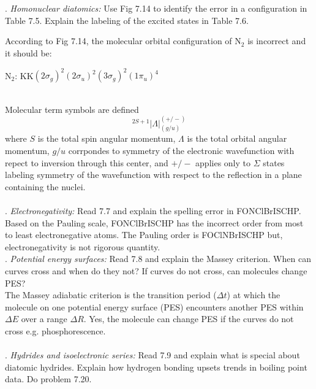 \documentclass{article}
\begin{document}
  \\
  \\
  . \textit{Homonuclear diatomics:} Use Fig 7.14 to identify the error in a configuration
  in Table 7.5. Explain the labeling of the excited states in Table 7.6.
  \\

  {\color{blue}
  According to Fig 7.14, the molecular orbital configuration of N$_2$ is incorrect and it
  should be:

  N$_2$: KK$(2\sigma_g)^2(2\sigma_u)^2(3\sigma_g)^2(1\pi_u)^4$}
  \\

  {\color{blue}
  Molecular term symbols are defined
  \begin{equation*}
    ^{2S+1}|\Lambda|_{(g/u)}^{(+/-)}
  \end{equation*}
  \noindent where $S$ is the total spin angular momentum, $\Lambda$ is the total orbital
  angular momentum, $g/u$ corrpondes to symmetry of the electronic wavefunction with repect
  to inversion through this center, and $+/-$ applies only to $\Sigma$ states labeling
  symmetry of the wavefunction with respect to the reflection in a plane containing the
  nuclei.}
  \\
  \\
  . \textit{Electronegativity:} Read 7.7 and explain the spelling error in FONClBrISCHP.
  \\

  {\color{blue}
  Based on the Pauling scale, FONClBrISCHP has the incorrect order from most to least electronegative
  atoms. The Pauling order is FOClNBrISCHP but, electronegativity is not rigorous quantity.}
  \\
  
  . \textit{Potential energy surfaces:} Read 7.8 and explain the Massey criterion.
  When can curves cross and when do they not? If curves do not cross, can molecules change
  PES?
  \\
  
  {\color{blue}
  The Massey adiabatic criterion is the transition period ($\Delta t$) at which the molecule
  on one potential energy surface (PES) encounters another PES within $\Delta E$ over a range
  $\Delta R$. Yes, the molecule can change PES if the curves do not cross e.g. phosphorescence.}
  \\
  \\
  . \textit{Hydrides and isoelectronic series:} Read 7.9 and explain what is special
  about diatomic hydrides. Explain how hydrogen bonding upsets trends in boiling point
  data. Do problem 7.20.
  \\
  
\end{document}
